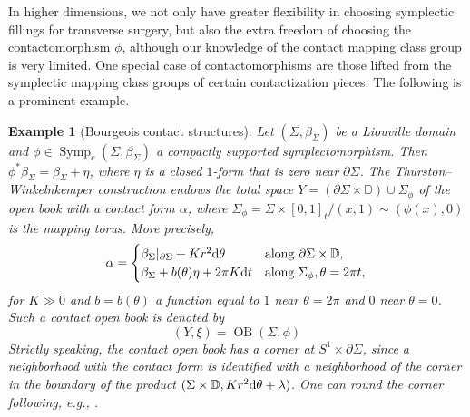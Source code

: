 \documentclass[11pt]{amsart}
\numberwithin{equation}{section}
\newtheorem{example}[theorem]{\textbf{Example}}
\def\D{{\mathbb D}}
\def\rd{{\rm d}}
\DeclareMathOperator{\symp}{Symp}
\DeclareMathOperator{\Openbook}{OB}
\begin{document}
In higher dimensions, we not only have greater flexibility in choosing symplectic fillings for transverse surgery, but also the extra freedom of choosing the contactomorphism $\phi$, although our knowledge of the contact mapping class group is very limited. One special case of contactomorphisms are those lifted from the symplectic mapping class groups of certain contactization pieces. The following is a prominent example.
\begin{example}[Bourgeois contact structures]\label{ex:Bourgeois}
Let $(\Sigma,\beta_{\Sigma})$ be a Liouville domain and $\phi\in \symp_c(\Sigma, \beta_{\Sigma})$ a compactly supported symplectomorphism. Then $\phi^*\beta_{\Sigma}=\beta_{\Sigma} + \eta$, where $\eta$ is a closed $1$-form that is zero near $\partial \Sigma$. The Thurston--Winkelnkemper construction endows the total space $Y=(\partial \Sigma\times \D) \cup \Sigma_{\phi}$ of the open book with a contact form $\alpha$, where $\Sigma_{\phi}=\Sigma \times [0,1]_t/(x,1)\sim (\phi(x),0)$ is the mapping torus. More precisely,
\begin{equation*}
    \alpha = \begin{cases}
    \beta_{\Sigma}|_{\partial \Sigma} + Kr^2 \rd \theta & \text{along } \partial \Sigma\times \D, \\
    \beta_{\Sigma} + b(\theta)\eta+2\pi K \rd t & \text{along } \Sigma_{\phi}, \theta=2\pi t,
    \end{cases}
\end{equation*}
for $K\gg 0$ and $b=b(\theta)$ a function equal to $1$ near $\theta=2\pi$ and $0$ near $\theta=0$. Such a contact open book is denoted by
\begin{equation*}
    (Y,\xi) = \Openbook(\Sigma, \phi)
\end{equation*}
Strictly speaking, the contact open book has a corner at $S^1 \times \partial \Sigma$, since a neighborhood with the contact form is identified with a neighborhood of the corner in the boundary of the product $(\Sigma\times \D, Kr^2\rd \theta+\lambda)$. One can round the corner following, e.g., \cite[\S 2.1]{zbMATH07673358}.


\end{example}
\end{document}
